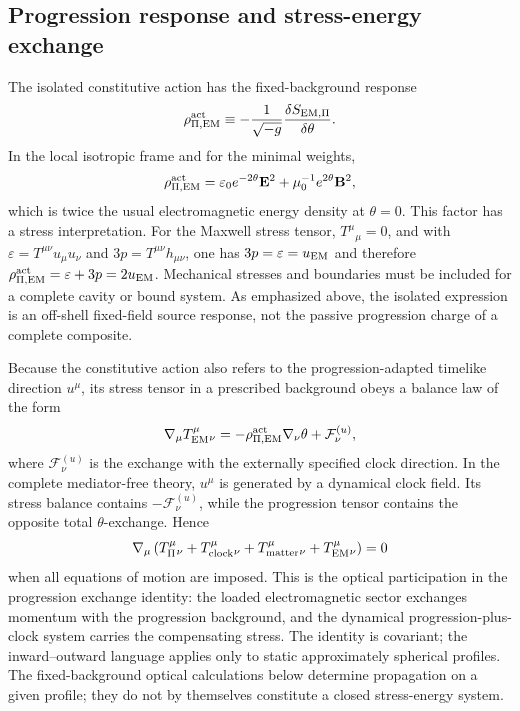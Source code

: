 \documentclass[12pt]{article}
\begin{document}
\subsection{Progression response and stress-energy exchange}

The isolated constitutive action has the fixed-background response
\begin{equation}
    \rho_{\Pi,{\rm EM}}^{\rm act}
    \equiv
    -\frac{1}{\sqrt{-g}}\frac{\delta S_{\rm EM,\Pi}}{\delta\theta}.
    \label{eq:em-positive-active-response}
\end{equation}
In the local isotropic frame and for the minimal weights,
\begin{equation}
    \rho_{\Pi,{\rm EM}}^{\rm act}
    =\varepsilon_0e^{-2\theta}\mathbf E^2
     +\mu_0^{-1}e^{2\theta}\mathbf B^2,
    \label{eq:em-active-response-local}
\end{equation}
which is twice the usual electromagnetic energy density at \(\theta=0\).  This factor has a stress interpretation.  For the Maxwell stress tensor, \(T^\mu{}_{\mu}=0\), and with \(\varepsilon=T^{\mu\nu}u_\mu u_\nu\) and \(3p=T^{\mu\nu}h_{\mu\nu}\), one has \(3p=\varepsilon=u_{\rm EM}\) and therefore \(\rho_{\Pi,{\rm EM}}^{\rm act}=\varepsilon+3p=2u_{\rm EM}\).  Mechanical stresses and boundaries must be included for a complete cavity or bound system.  As emphasized above, the isolated expression is an off-shell fixed-field source response, not the passive progression charge of a complete composite.

Because the constitutive action also refers to the progression-adapted timelike direction \(u^\mu\), its stress tensor in a prescribed background obeys a balance law of the form
\begin{equation}
    \nabla_\mu T_{\rm EM}^{\mu}{}_{\nu}
    =-\rho_{\Pi,{\rm EM}}^{\rm act}\nabla_\nu\theta
     +\mathcal F^{(u)}_\nu,
    \label{eq:em-background-balance}
\end{equation}
where \(\mathcal F^{(u)}_\nu\) is the exchange with the externally specified clock direction.  In the complete mediator-free theory, \(u^\mu\) is generated by a dynamical clock field.  Its stress balance contains \(-\mathcal F^{(u)}_\nu\), while the progression tensor contains the opposite total \(\theta\)-exchange.  Hence
\begin{equation}
    \nabla_\mu\left(
      T_\Pi^{\mu}{}_{\nu}
      +T_{\rm clock}^{\mu}{}_{\nu}
      +T_{\rm matter}^{\mu}{}_{\nu}
      +T_{\rm EM}^{\mu}{}_{\nu}
      \right)=0
    \label{eq:optical-total-conservation}
\end{equation}
when all equations of motion are imposed.  This is the optical participation in the progression exchange identity: the loaded electromagnetic sector exchanges momentum with the progression background, and the dynamical progression-plus-clock system carries the compensating stress.  The identity is covariant; the inward--outward language applies only to static approximately spherical profiles.  The fixed-background optical calculations below determine propagation on a given profile; they do not by themselves constitute a closed stress-energy system.
\end{document}
